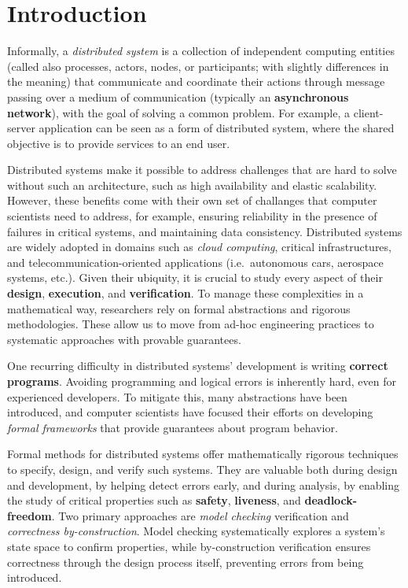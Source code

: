 \chapter{Introduction} \label{chap:intro}
\pagestyle{plain}
\setcounter{page}{1}

Informally, a \textit{distributed system} is a collection of independent 
computing entities (called also processes, actors, 
nodes, or participants; with slightly differences in the meaning) 
that communicate and coordinate their 
actions through message passing over a medium of communication 
(typically an \textbf{asynchronous network}), with the goal of solving a 
common problem. For example, a client-server application can be seen 
as a form of distributed system, where the shared objective is to provide 
services to an end user.

Distributed systems make it possible to address challenges that are
hard to solve without such an architecture, such as high availability
and elastic scalability. However, these benefits come with their own
set of challanges that computer scientists need to
address, for example, ensuring reliability in the presence of failures
in critical systems, and maintaining data consistency.
Distributed systems are 
widely adopted in domains such as \textit{cloud computing}, critical 
infrastructures, and telecommunication-oriented applications (i.e.\ 
autonomous cars, aerospace systems, etc.). Given their ubiquity, it is 
crucial to study every aspect of their \textbf{design}, \textbf{execution}, 
and \textbf{verification}.
To manage these complexities in a mathematical way, researchers rely on
formal abstractions and rigorous methodologies. These allow us to move
from ad-hoc engineering practices to systematic approaches with
provable guarantees.

One recurring difficulty in distributed systems' development is writing 
\textbf{correct programs}. Avoiding programming and logical errors is 
inherently hard, even for experienced developers. To mitigate this, many 
abstractions have been introduced, and computer scientists have focused their 
efforts on developing \textit{formal frameworks} that provide guarantees 
about program behavior. 

Formal methods for distributed systems offer mathematically rigorous 
techniques to specify, design, and verify such systems. They are valuable 
both during design and development, by helping detect errors early, and during analysis, 
by enabling the study of critical properties such as \textbf{safety}, 
\textbf{liveness}, and \textbf{deadlock-freedom}. Two primary 
approaches are \textit{model checking} verification and 
\textit{correctness by-construction}.
Model checking systematically explores a system's state space 
to confirm properties, while by-construction verification ensures correctness 
through the design process itself, preventing errors from being introduced.  

